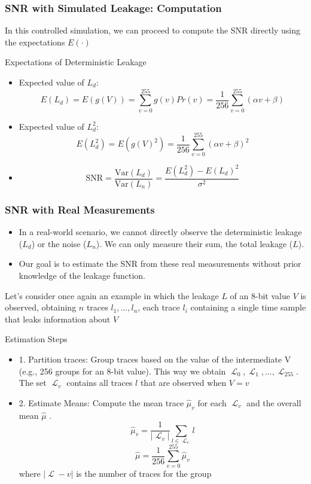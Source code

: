 \begin{frame}
    \frametitle{SNR with Simulated Leakage: Computation}
    
            In this controlled simulation, we can proceed to compute the SNR directly using the expectations $E(\cdot)$
       

    \begin{block}{Expectations of Deterministic Leakage}
        \begin{itemize}
            \item Expected value of $L_d$:
            $$ E(L_d) = E(g(V)) = \sum_{v=0}^{255} g(v)Pr(v) = \frac{1}{256} \sum_{v=0}^{255} (\alpha v + \beta) $$
            \item Expected value of $L_d^2$:
            $$ E(L_d^2) = E(g(V)^2) = \frac{1}{256} \sum_{v=0}^{255} (\alpha v + \beta)^2 $$
            \item $$ \text{SNR} = \frac{\text{Var}(L_d)}{\text{Var}(L_n)} = \frac{E(L_d^2) - E(L_d)^2}{\sigma^2} $$

        \end{itemize}
    \end{block}
\end{frame}

\begin{frame}
    \frametitle{SNR with Real Measurements}
    \begin{block}{}
        \begin{itemize}
            \item In a real-world scenario, we cannot directly observe the deterministic leakage ($L_d$) or the noise ($L_n$). We can only measure their sum, the total leakage ($L$).
            \item Our goal is to estimate the SNR from these real measurements without prior knowledge of the leakage function.
        \end{itemize}
    \end{block}
        Let's consider once again an example in which the leakage $L$ of an 8-bit value $V$ is observed, obtaining $n$ traces $l_1, ..., l_n$, each trace $l_i$ containing a single time sample that leaks information about $V$
\end{frame}
\newcommand{\Lagr}{\mathop{\mathcal{L}}}
\begin{frame}
    \begin{block}{Estimation Steps}
        \begin{itemize}
            \item 1. Partition traces: Group traces based on the value of the intermediate V (e.g., 256 groups for an 8-bit value). This way we obtain $\Lagr_0,\Lagr_1,...,\Lagr_{255}$. The set $\Lagr_v$ contains all traces $l$ that are observed when $V=v$
            \item 2. Estimate Means: Compute the mean trace $\hat{\mu}_v$ for each $\Lagr_v$ and the overall mean $\hat{\mu}$ . $$\hat{\mu}_v=\frac{1}{|\Lagr_v|}\sum_{l \in \Lagr_v} l$$ $$\hat{\mu}=\frac{1}{256}\sum_{v=0}^{255}\hat{\mu}_v$$ where $|\Lagr-v|$ is the number of traces for the group
        \end{itemize}
    \end{block}
\end{frame}

